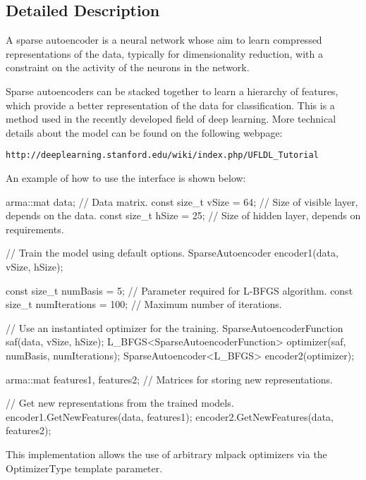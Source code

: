 \subsection{Detailed Description}
A sparse autoencoder is a neural network whose aim to learn compressed representations of the data, typically for dimensionality reduction, with a constraint on the activity of the neurons in the network. 

Sparse autoencoders can be stacked together to learn a hierarchy of features, which provide a better representation of the data for classification. This is a method used in the recently developed field of deep learning. More technical details about the model can be found on the following webpage\+:

{\tt http\+://deeplearning.\+stanford.\+edu/wiki/index.\+php/\+U\+F\+L\+D\+L\+\_\+\+Tutorial}

An example of how to use the interface is shown below\+:


\begin{DoxyCode}
arma::mat data; \textcolor{comment}{// Data matrix.}
\textcolor{keyword}{const} \textcolor{keywordtype}{size\_t} vSize = 64; \textcolor{comment}{// Size of visible layer, depends on the data.}
\textcolor{keyword}{const} \textcolor{keywordtype}{size\_t} hSize = 25; \textcolor{comment}{// Size of hidden layer, depends on requirements.}

\textcolor{comment}{// Train the model using default options.}
SparseAutoencoder encoder1(data, vSize, hSize);

\textcolor{keyword}{const} \textcolor{keywordtype}{size\_t} numBasis = 5; \textcolor{comment}{// Parameter required for L-BFGS algorithm.}
\textcolor{keyword}{const} \textcolor{keywordtype}{size\_t} numIterations = 100; \textcolor{comment}{// Maximum number of iterations.}

\textcolor{comment}{// Use an instantiated optimizer for the training.}
SparseAutoencoderFunction saf(data, vSize, hSize);
L\_BFGS<SparseAutoencoderFunction> optimizer(saf, numBasis, numIterations);
SparseAutoencoder<L\_BFGS> encoder2(optimizer);

arma::mat features1, features2; \textcolor{comment}{// Matrices for storing new representations.}

\textcolor{comment}{// Get new representations from the trained models.}
encoder1.GetNewFeatures(data, features1);
encoder2.GetNewFeatures(data, features2);
\end{DoxyCode}


This implementation allows the use of arbitrary mlpack optimizers via the Optimizer\+Type template parameter. 

